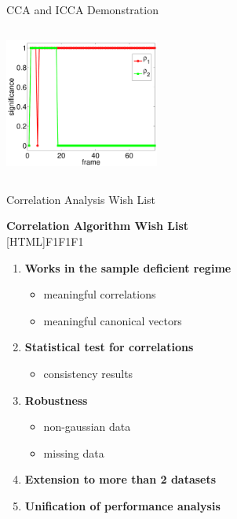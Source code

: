 \documentclass[8pt]{beamer}
\begin{document}
\begin{frame}{CCA and ICCA Demonstration}
\begin{columns}[T]
\begin{column}{1\textwidth}
\begin{center}
        \hspace{2ex}
        \includegraphics[width=0.38\textwidth]{figures/av_icca_sig_zoom.pdf}
    \end{center}
  \end{column}
  \end{columns}


\end{frame}

\begin{frame}{Correlation Analysis Wish List}
  \addtocounter{framenumber}{-1}

  \begin{center}
    \textbf{Correlation Algorithm Wish List}\\[1ex]
[HTML]{F1F1F1}{\parbox{0.8\textwidth}{%
    \begin{enumerate}
    \item \textbf{Works in the sample deficient regime}
      \begin{itemize}
      \item {\textcolor{texthigh}{meaningful correlations \checkmark}}
      \item meaningful canonical vectors
      \end{itemize}
    \item {\textcolor{texthigh}{\textbf{Statistical test for correlations} \checkmark}}
      \begin{itemize}
      \item {\textcolor{texthigh}{consistency results \checkmark}}
      \end{itemize}
    \item \textbf{Robustness}
      \begin{itemize}
      \item non-gaussian data
      \item missing data
      \end{itemize}
    \item \textbf{Extension to more than 2 datasets}
    \item \textbf{Unification of performance analysis}
    \end{enumerate}
}}
\end{center}

\end{frame}
\end{document}
